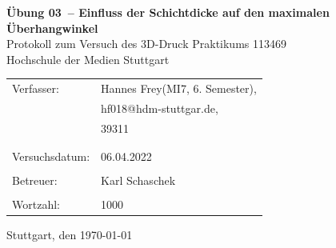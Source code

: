 \documentclass[a4paper,12pt,bibtotocnumbered]{scrartcl}
\makeatletter
\numberwithin{equation}{section} %
\newcommand{\VERSUCHSDATUM}{06.04.2022}
\newcommand{\PROTOKOLLDATUM}{\today}
\newcommand{\VerfasserEINS}{Hannes Frey}
\newcommand{\MatNoEINS}{39311}
\newcommand{\StudiengangEINS}{MI7}
\newcommand{\SemesterEINS}{6. Semester}
\newcommand{\MailEINS}{hf018@hdm-stuttgar.de}
\newcommand{\VerfasserZWEI}{Verfasser 2}
\newcommand{\MatNoZWEI}{Matrikelnummer 2}
\newcommand{\StudiengangZWEI}{Technologiemanagement}
\newcommand{\BETREUER}{Karl Schaschek}
\newcommand{\WORTZAHL}{1000}
\newcommand{\GRUPPENNR}{Z-999}
\newcommand{\VERSUCHSNR}{Übung 03}
\newcommand{\VERSUCHSNAME}{Einfluss der Schichtdicke auf den maximalen Überhangwinkel}
\makeatother
\begin{document}
\thispagestyle{empty}


\begin{titlepage}

\begin{center}
\Huge{\textbf{\VERSUCHSNR\ – \VERSUCHSNAME}}\\%
\vspace{10mm}%
\Large{Protokoll zum Versuch des 3D-Druck Praktikums 113469  %
}\\
\vspace{10mm} 
\Large{Hochschule der Medien Stuttgart}\\
\end{center}
\vspace{1cm}
\begin{center}
\begin{tabular}{ll}
\large{Verfasser:}		& \large{\VerfasserEINS\;(\StudiengangEINS, \SemesterEINS),} \\ 
						& \large{\MailEINS}, \\
 						& \large{\MatNoEINS} \\
						\vspace{0cm}\\
\vspace{0cm}\\
\large{Versuchsdatum:}	& \large{\VERSUCHSDATUM} \\
\vspace{0cm}\\
\large{Betreuer:}		& \large{\BETREUER} \\
\vspace{0cm}\\
\large{Wortzahl:}		& \large{\WORTZAHL}
\end{tabular}
\end{center}
\vspace{65mm}

\begin{center}
Stuttgart, den \PROTOKOLLDATUM
\end{center}

\end{titlepage}
\end{document}
